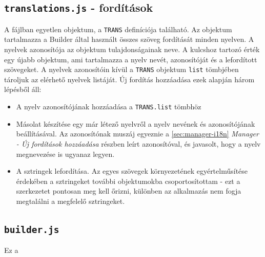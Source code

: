\documentclass[12pt,a4paper,twoside]{article}
\begin{document}
\subsection{\texttt{translations.js} - fordítások}
\label{sec:builder-i18n}

A fájlban egyetlen objektum, a \texttt{TRANS} definíciója található. Az objektum
tartalmazza a Builder által használt összes szöveg fordítását minden nyelven. A
nyelvek azonosítója az objektum tulajdonságainak neve. A kulcshoz tartozó érték
egy újabb objektum, ami tartalmazza a nyelv nevét, azonosítóját és a lefordított
szövegeket. A nyelvek azonosítóin kívül a \texttt{TRANS} objektum \texttt{list}
tömbjében tároljuk az elérhető nyelvek listáját. Új fordítás hozzáadása ezek
alapján három lépésből áll:

\begin{itemize}
\item A nyelv azonosítójának hozzáadása a \texttt{TRANS.list} tömbhöz
\item Másolat készítése egy már létező nyelvről a nyelv nevének és
  azonosítójának beállításával. Az azonosítónak muszáj egyeznie a
  \ref{sec:manager-i18n} \textit{Manager - Új fordítások hozzáadása} részben leírt
  azonosítóval, és javasolt, hogy a nyelv megnevezése is ugyanaz legyen.
\item A sztringek lefordítása. Az egyes szövegek környezetének egyértelműsítése
  érdekében a sztringeket további objektumokba csoportosítottam - ezt a
  szerkezetet pontosan meg kell őrizni, különben az alkalmazás nem fogja
  megtalálni a megfelelő sztringeket.
\end{itemize}


\subsection{\texttt{builder.js}}
Ez a
\end{document}
